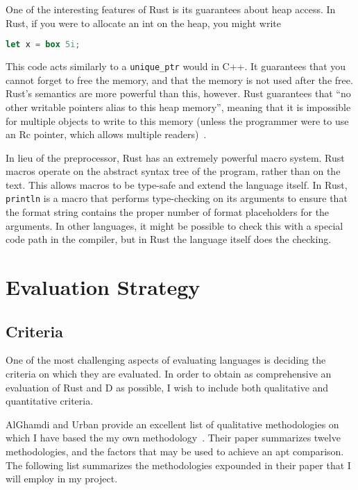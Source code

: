 \documentclass[draftcopy]{srpaper}
\begin{document}
One of the interesting features of Rust is its guarantees about heap access.
In Rust, if you were to allocate an int on the heap, you might write

\begin{lstlisting}[language=Rust]
    let x = box 5i;
\end{lstlisting}

This code acts similarly to a \texttt{unique\_ptr} would in C++. It guarantees
that you cannot forget to free the memory, and that the memory is not used
after the free. Rust's semantics are more powerful than this, however. Rust
guarantees that ``no other writable pointers alias to this heap memory'',
meaning that it is impossible for multiple objects to write to this memory
(unless the programmer were to use an Rc pointer, which allows multiple
readers)~\cite{RustPointerGuide}.

In lieu of the preprocessor, Rust has an extremely powerful macro system.
Rust macros operate on the abstract syntax tree of the program, rather than on
the text. This allows macros to be type-safe and extend the language itself.
In Rust, \texttt{println} is a macro that performs type-checking on its
arguments to ensure that the format string contains the proper number of
format placeholders for the arguments. In other languages, it might be
possible to check this with a special code path in the compiler, but in Rust
the language itself does the checking.

\chapter{Evaluation Strategy}

\section{Criteria}

One of the most challenging aspects of evaluating languages is deciding the
criteria on which they are evaluated. In order to obtain as comprehensive an
evaluation of Rust and D as possible, I wish to include both qualitative and
quantitative criteria.

AlGhamdi and Urban provide an excellent list of qualitative methodologies on
which I have based the my own
methodology~\cite{AlGhamdi:1993:CAP:162754.162876}. Their paper summarizes
twelve methodologies, and the factors that may be used to achieve an apt
comparison. The following list summarizes the methodologies expounded in their
paper that I will employ in my project.
\end{document}
